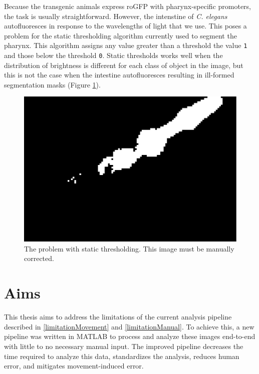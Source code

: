 Because the transgenic animals express roGFP with pharynx-specific promoters, the task is usually straightforward. However, the intenstine of \textit{C. elegans} autofluoresces in response to the wavelengths of light that we use. This poses a problem for the static thresholding algorithm currently used to segment the pharynx. This algorithm assigns any value greater than a threshold the value \texttt{1} and those below the threshold \texttt{0}. Static thresholds works well when the distribution of brightness is different for each class of object in the image, but this is not the case when the intestine autofluoresces resulting in ill-formed segmentation masks (Figure \ref{fig:SegmentationNaive}).

\begin{figure}[ht]
    \centering
    \includegraphics[scale=.25]{Figures/rendered_files/segmentation_naive}
    \decoRule
    \caption[The problem with static thresholding]{The problem with static thresholding. This image must be manually corrected.}
    \label{fig:SegmentationNaive}
\end{figure}

\section{Aims}
This thesis aims to address the limitations of the current analysis pipeline described in \ref{limitationMovement} and \ref{limitationManual}. To achieve this, a new pipeline was written in MATLAB to process and analyze these images end-to-end with little to no necessary manual input. The improved pipeline decreases the time required to analyze this data, standardizes the analysis, reduces human error, and mitigates movement-induced error.